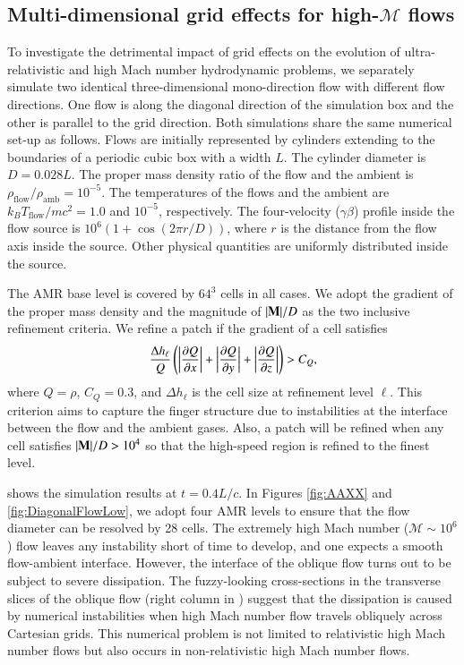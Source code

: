 \documentclass[twocolumn]{aastex63}
\begin{document}
\subsection{Multi-dimensional grid effects for high-$\mathscr{M}$ flows}
\label{Multi-dimensional grid effects}
To investigate the detrimental impact of grid effects on the evolution of ultra-relativistic and high Mach number hydrodynamic problems, we separately simulate two identical three-dimensional mono-direction flow with different flow directions. One flow is along the diagonal direction of the simulation box and the other is parallel to the grid direction. Both simulations share the same numerical set-up as follows. Flows are initially represented by cylinders extending to the boundaries of a periodic cubic box with a width $L$. The cylinder diameter is $D=0.028L$. The proper mass density ratio of the flow and the ambient is $\rho_{\text{flow}}/\rho_{\text{amb}}=10^{-5}$. The temperatures of the flows and the ambient are $k_{B}T_{\text{flow}}/mc^2=1.0$ and $10^{-5}$, respectively. The four-velocity ($\gamma \beta$) profile inside the flow source is $10^{6}\left(1+\cos{\left(2\pi r/D\right)}\right)$, where $r$ is the distance from the flow axis inside the source. Other physical quantities are uniformly distributed inside the source.

The AMR base level is covered by $64^{3}$ cells in all cases. We adopt the gradient of the proper mass density and the magnitude of $\abs{\mathbf{M}}/D$ as the two inclusive refinement criteria. We refine a patch if the gradient of a cell satisfies
\begin{equation}
\frac{\Delta h_{\ell}}{Q}
\left(
\abs{\frac{\partial Q}{\partial x}}+
\abs{\frac{\partial Q}{\partial y}}+
\abs{\frac{\partial Q}{\partial z}}
\right)
> C_{Q},
\label{threshold for gradient}
\end{equation}
where $Q=\rho$, $C_{Q}=0.3$, and $\Delta h_{\ell}$ is the cell size at refinement level $\ell$. This criterion aims to capture the finger structure due to instabilities at the interface between the flow and the ambient gases. Also, a patch will be refined when any cell satisfies $\abs{\mathbf{M}}/D>10^{4}$ so that the high-speed region is refined to the finest level.

 shows the simulation results at $t=0.4L/c$. In Figures \ref{fig:AAXX} and \ref{fig:DiagonalFlowLow}, we adopt four AMR levels to ensure that the flow diameter can be resolved by 28 cells. The extremely high Mach number ($\mathscr{M}\sim 10^{6}$) flow leaves any instability short of time to develop, and one expects a smooth flow-ambient interface. However, the interface of the oblique flow turns out to be subject to severe dissipation. The fuzzy-looking cross-sections in the transverse slices of the oblique flow (right column in ) suggest that the dissipation is caused by numerical instabilities when high Mach number flow travels obliquely across Cartesian grids. This numerical problem is not limited to relativistic high Mach number flows but also occurs in non-relativistic high Mach number flows.
\end{document}
